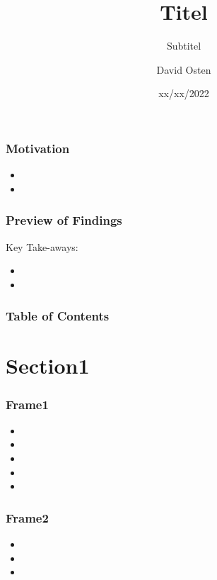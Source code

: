 \documentclass[xcolor={usenames,dvipsnames}, 
	hyperref={
	colorlinks=false, 						%
	linkcolor=black, 						%
	urlcolor=black,							%
	citecolor=black,						%
	pdfpagelabels=false,
	},
	ignorenonframetext,			%
	compress					%
]{beamer}
\title{Titel}
\subtitle[Optional Subtitle]{Subtitel}
\author{David Osten}
\institute{Topic/Lecture Series}
\date{xx/xx/2022}
\begin{document}
\begin{frame}  %
	\titlepage
\end{frame}
	
\addtocounter{framenumber}{-1} %







\begin{frame}
	\frametitle{Motivation}
	\begin{itemize}
		\item 
		\item 
	\end{itemize}
\end{frame}

\begin{frame}
	\frametitle{Preview of Findings}
	Key Take-aways:
	\begin{itemize}
		\item 
		\item 
	\end{itemize}
\end{frame}

\begin{frame}
	\frametitle{Table of Contents}
	\tableofcontents
\end{frame}


\section{Section1}
\begin{frame}
	\frametitle{Frame1}
	\begin{itemize}
	\item 
	\item 
	\item
	\item 
	\item 
\end{itemize}

\end{frame}


\begin{frame}
\frametitle{Frame2}

\begin{itemize}
	\item 
	\item
	\item 
\end{itemize}

\end{frame}
\end{document}
